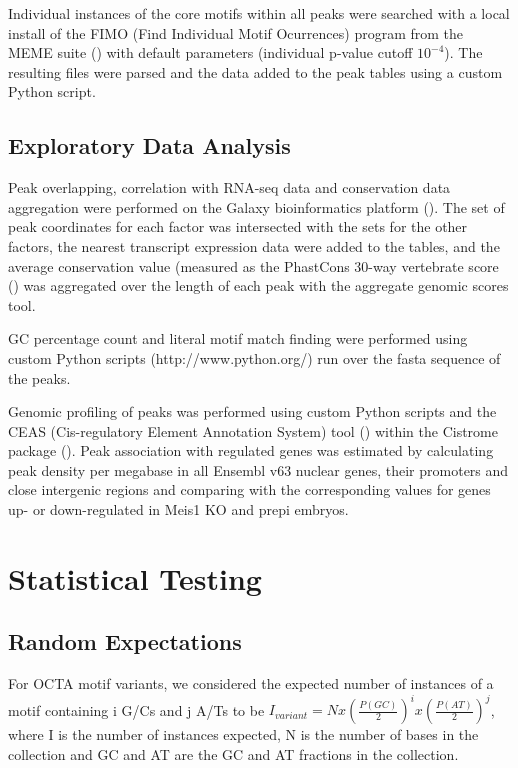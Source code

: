 Individual instances of the core motifs within all peaks were searched with a local install of the FIMO (Find Individual Motif Ocurrences) program from the MEME suite (\cite{Bailey2009}) with default parameters (individual p-value cutoff $10^{-4}$). The resulting files were parsed and the data added to the peak tables using a custom Python script. 



\subsection{Exploratory Data Analysis}


Peak overlapping, correlation with RNA-seq data and conservation data aggregation were performed on the Galaxy bioinformatics platform (\cite{Blankenberg2010a, Goecks2010}). The set of peak coordinates for each factor was intersected with the sets for the other factors, the nearest transcript expression data were added to the tables, and the average conservation value (measured as the PhastCons 30-way vertebrate score (\cite{Siepel2005}) was aggregated over the length of each peak with the aggregate genomic scores tool.

GC percentage count and literal motif match finding were performed using custom Python scripts (http://www.python.org/) run over the fasta sequence of the peaks.

Genomic profiling of peaks was performed using custom Python scripts and the CEAS (Cis-regulatory Element Annotation System) tool (\cite{Shin2009}) within the Cistrome package (\cite{Liu2011}). Peak association with regulated genes was estimated by calculating peak density per megabase in all Ensembl v63 nuclear genes, their promoters and close intergenic regions and comparing with the corresponding values for genes up- or down-regulated in Meis1 \ac{KO} and \ac{prepi} embryos. 

\section{Statistical Testing}

\subsection{Random Expectations}

For \ac{OCTA} motif variants, we considered the expected number of instances of a motif containing i G/Cs and j A/Ts to be $I_{variant} = N x {\left(\frac{P(GC)}{2}\right)}^i x {\left(\frac{P(AT)}{2}\right)}^j$, where I is the number of instances expected, N is the number of bases in the collection and GC and AT are the GC and AT fractions in the collection.

